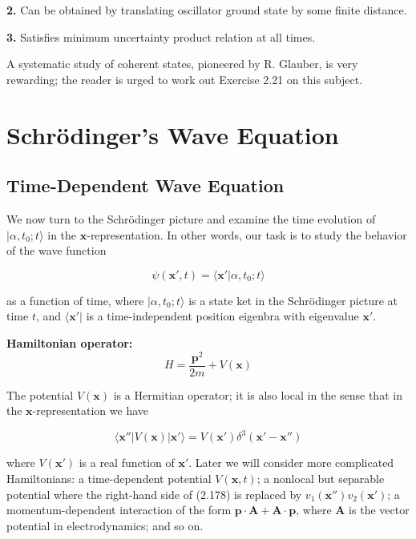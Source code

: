 \documentclass[11pt,a4paper]{article}
\begin{document}
\textbf{2.} Can be obtained by translating oscillator ground state by some finite distance.

\textbf{3.} Satisfies minimum uncertainty product relation at all times.

A systematic study of coherent states, pioneered by R. Glauber, is very rewarding; the reader is urged to work out Exercise 2.21 on this subject.


\newpage
\section{Schrödinger's Wave Equation}

\subsection{Time-Dependent Wave Equation}

We now turn to the Schrödinger picture and examine the time evolution of $|\alpha, t_0; t\rangle$ in the $\mathbf{x}$-representation. In other words, our task is to study the behavior of the wave function

\begin{equation}
\boxed{\psi(\mathbf{x}', t) = \langle \mathbf{x}'|\alpha, t_0; t\rangle}
\tag{2.176}
\end{equation}

as a function of time, where $|\alpha, t_0; t\rangle$ is a state ket in the Schrödinger picture at time $t$, and $\langle \mathbf{x}'|$ is a time-independent position eigenbra with eigenvalue $\mathbf{x}'$.

\textbf{Hamiltonian operator:}
\begin{equation}
H = \frac{\mathbf{p}^2}{2m} + V(\mathbf{x})
\tag{2.177}
\end{equation}

The potential $V(\mathbf{x})$ is a Hermitian operator; it is also local in the sense that in the $\mathbf{x}$-representation we have

\begin{equation}
\langle \mathbf{x}''|V(\mathbf{x})|\mathbf{x}'\rangle = V(\mathbf{x}')\delta^3(\mathbf{x}' - \mathbf{x}'')
\tag{2.178}
\end{equation}

where $V(\mathbf{x}')$ is a real function of $\mathbf{x}'$. Later we will consider more complicated Hamiltonians: a time-dependent potential $V(\mathbf{x}, t)$; a nonlocal but separable potential where the right-hand side of (2.178) is replaced by $v_1(\mathbf{x}'')v_2(\mathbf{x}')$; a momentum-dependent interaction of the form $\mathbf{p} \cdot \mathbf{A} + \mathbf{A} \cdot \mathbf{p}$, where $\mathbf{A}$ is the vector potential in electrodynamics; and so on.
\end{document}
